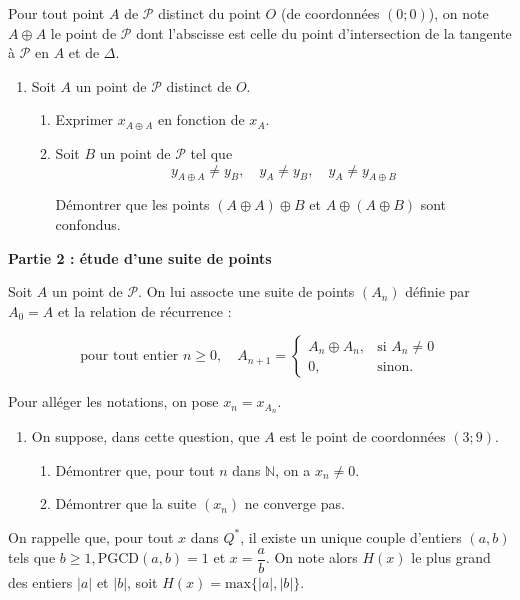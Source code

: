 \documentclass[11pt,a4paper,french]{article}
\newcommand{\N}{\mathbb{N}}
\begin{document}
Pour tout point $A$ de $\mathcal{P}$ distinct du point $O$ (de coordonnées $(0;0)$), on note $A \oplus A$ le point de $\mathcal{P}$ dont l'abscisse est celle du point d'intersection de la tangente à $\mathcal{P}$ en $A$ et de $\Delta$.
\begin{enumerate}[resume]
\item Soit $A$ un point de $\mathcal{P}$ distinct de $O$.
\begin{enumerate}
\item  Exprimer $x_{A \oplus A}$ en fonction de $x_{A}$.
\item Soit $B$ un point de $\mathcal{P}$ tel que 
\[y_{A\oplus A}\not=y_B, \quad y_A\not=y_B,\quad y_A \not=y_{A\oplus B}\]

Démontrer que les points $(A\oplus A) \oplus B$ et $A\oplus(A \oplus B)$ sont confondus.
\end{enumerate}
\end{enumerate}
\vspace{0.5cm}

\begin{center}
\textbf{Partie 2 : étude d'une suite de points}
\end{center}

Soit $A$ un point de $\mathcal{P}$. On lui assocte une suite de points $(A_n)$ définie par $A_0 = A$ et la relation de récurrence :

\[\text{pour tout entier } n\geqslant 0,\quad  A_{n+1}=\begin{cases}A_n \oplus A_n, & \text{si }A_n\not=0\\0, & \text{sinon. }\end{cases}\] 

Pour alléger les notations, on pose $x_n= x_{A_n}$. 
\begin{enumerate}[resume]
\item  On suppose, dans cette question, que $A$ est le point de coordonnées $(3;9)$.
\begin{enumerate}
\item  Démontrer que, pour tout $n$ dans $\N$, on a $x_n\not= 0$.
 \item Démontrer que la suite $(x_n)$ ne converge pas.
\end{enumerate}
\end{enumerate}

\medskip

On rappelle que, pour tout $x $ dans $Q^*$, il existe un unique couple d'entiers $(a, b)$ tels que $b \geqslant 1, \mathrm{PGCD}(a, b) = 1$ et $x= \dfrac{a}{b}$. On note alors $H(x)$ le plus grand des entiers $\vert a \vert $ et $\vert b\vert$, soit  $H(x) = \mathrm{max}\{\vert a\vert, \vert b \vert\}$.
\end{document}
